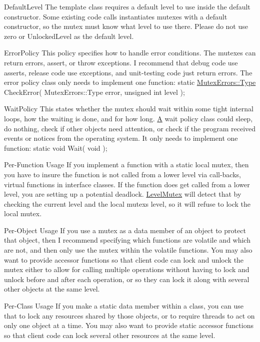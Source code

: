 \begin{DoxyParagraph}{Default\+Level}
The template class requires a default level to use inside the default constructor. Some existing code calls instantiates mutexes with a default constructor, so the mutex must know what level to use there. Please do not use zero or Unlocked\+Level as the default level.
\end{DoxyParagraph}
\begin{DoxyParagraph}{Error\+Policy}
This policy specifies how to handle error conditions. The mutexes can return errors, assert, or throw exceptions. I recommend that debug code use asserts, release code use exceptions, and unit-\/testing code just return errors. The error policy class only needs to implement one function\+: static \hyperlink{classLoki_1_1MutexErrors_acd0eb6065ca303083d2e0229d7bff590}{Mutex\+Errors\+::\+Type} Check\+Error( Mutex\+Errors\+::\+Type error, unsigned int level );
\end{DoxyParagraph}
\begin{DoxyParagraph}{Wait\+Policy}
This states whether the mutex should wait within some tight internal loops, how the waiting is done, and for how long. \hyperlink{structA}{A} wait policy class could sleep, do nothing, check if other objects need attention, or check if the program received events or notices from the operating system. It only needs to implement one function\+: static void Wait( void );
\end{DoxyParagraph}
\begin{DoxyParagraph}{Per-\/\+Function Usage}
If you implement a function with a static local mutex, then you have to insure the function is not called from a lower level via call-\/backs, virtual functions in interface classes. If the function does get called from a lower level, you are setting up a potential deadlock. \hyperlink{classLoki_1_1LevelMutex}{Level\+Mutex} will detect that by checking the current level and the local mutex\textquotesingle{}s level, so it will refuse to lock the local mutex.
\end{DoxyParagraph}
\begin{DoxyParagraph}{Per-\/\+Object Usage}
If you use a mutex as a data member of an object to protect that object, then I recommend specifying which functions are volatile and which are not, and then only use the mutex within the volatile functions. You may also want to provide accessor functions so that client code can lock and unlock the mutex either to allow for calling multiple operations without having to lock and unlock before and after each operation, or so they can lock it along with several other objects at the same level.
\end{DoxyParagraph}
\begin{DoxyParagraph}{Per-\/\+Class Usage}
If you make a static data member within a class, you can use that to lock any resources shared by those objects, or to require threads to act on only one object at a time. You may also want to provide static accessor functions so that client code can lock several other resources at the same level. 
\end{DoxyParagraph}


